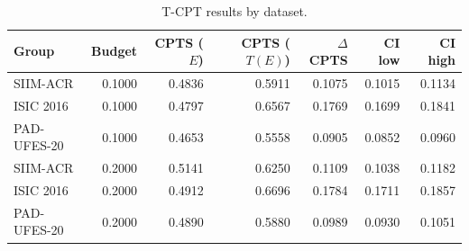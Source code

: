\begin{table}[t]
\caption{T-CPT results by dataset.}
\label{tab:tcpt_dataset}
\begin{tabular}{lrrrrrr}
\toprule
Group & Budget & CPTS ($E$) & CPTS ($T(E)$) & $\Delta$CPTS & CI low & CI high \\
\midrule
SIIM-ACR & 0.1000 & 0.4836 & 0.5911 & 0.1075 & 0.1015 & 0.1134 \\
ISIC 2016 & 0.1000 & 0.4797 & 0.6567 & 0.1769 & 0.1699 & 0.1841 \\
PAD-UFES-20 & 0.1000 & 0.4653 & 0.5558 & 0.0905 & 0.0852 & 0.0960 \\
SIIM-ACR & 0.2000 & 0.5141 & 0.6250 & 0.1109 & 0.1038 & 0.1182 \\
ISIC 2016 & 0.2000 & 0.4912 & 0.6696 & 0.1784 & 0.1711 & 0.1857 \\
PAD-UFES-20 & 0.2000 & 0.4890 & 0.5880 & 0.0989 & 0.0930 & 0.1051 \\
\bottomrule
\end{tabular}
\end{table}
